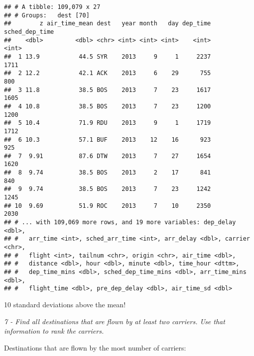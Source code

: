 \documentclass[]{article}
\newenvironment{Shaded}{\begin{snugshade}}{\end{snugshade}}
\newcommand{\KeywordTok}[1]{\textcolor[rgb]{0.13,0.29,0.53}{\textbf{#1}}}
\newcommand{\DataTypeTok}[1]{\textcolor[rgb]{0.13,0.29,0.53}{#1}}
\newcommand{\DecValTok}[1]{\textcolor[rgb]{0.00,0.00,0.81}{#1}}
\newcommand{\StringTok}[1]{\textcolor[rgb]{0.31,0.60,0.02}{#1}}
\newcommand{\OperatorTok}[1]{\textcolor[rgb]{0.81,0.36,0.00}{\textbf{#1}}}
\newcommand{\NormalTok}[1]{#1}
\theoremstyle{definition}
\theoremstyle{definition}
\theoremstyle{definition}
\theoremstyle{remark}
\begin{document}
\begin{verbatim}
## # A tibble: 109,079 x 27
## # Groups:   dest [70]
##        z air_time_mean dest   year month   day dep_time sched_dep_time
##    <dbl>         <dbl> <chr> <int> <int> <int>    <int>          <int>
##  1 13.9           44.5 SYR    2013     9     1     2237           1711
##  2 12.2           42.1 ACK    2013     6    29      755            800
##  3 11.8           38.5 BOS    2013     7    23     1617           1605
##  4 10.8           38.5 BOS    2013     7    23     1200           1200
##  5 10.4           71.9 RDU    2013     9     1     1719           1712
##  6 10.3           57.1 BUF    2013    12    16      923            925
##  7  9.91          87.6 DTW    2013     7    27     1654           1620
##  8  9.74          38.5 BOS    2013     2    17      841            840
##  9  9.74          38.5 BOS    2013     7    23     1242           1245
## 10  9.69          51.9 ROC    2013     7    10     2350           2030
## # ... with 109,069 more rows, and 19 more variables: dep_delay <dbl>,
## #   arr_time <int>, sched_arr_time <int>, arr_delay <dbl>, carrier <chr>,
## #   flight <int>, tailnum <chr>, origin <chr>, air_time <dbl>,
## #   distance <dbl>, hour <dbl>, minute <dbl>, time_hour <dttm>,
## #   dep_time_mins <dbl>, sched_dep_time_mins <dbl>, arr_time_mins <dbl>,
## #   flight_time <dbl>, pre_dep_delay <dbl>, air_time_sd <dbl>
\end{verbatim}

10 standard deviations above the mean!

\emph{7 - Find all destinations that are flown by at least two carriers.
Use that information to rank the carriers.}

Destinations that are flown by the most number of carriers:

\begin{Shaded}
\end{Shaded}
\end{document}
